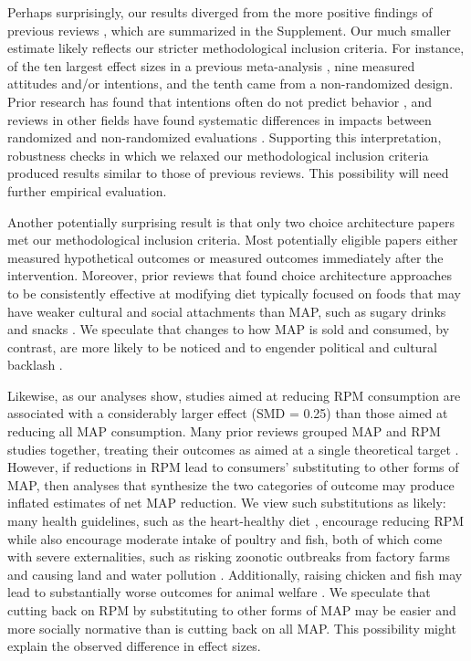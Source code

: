 \documentclass[preprint, 3p,
authoryear]{elsarticle} %
\begin{document}
Perhaps surprisingly, our results diverged from the more positive
findings of previous reviews
\citep{mathur2021meta, meier2022, mertens2022}, which are summarized in
the Supplement. Our much smaller estimate likely reflects our stricter
methodological inclusion criteria. For instance, of the ten largest
effect sizes in a previous meta-analysis
\citep{mathur2021effectiveness}, nine measured attitudes and/or
intentions, and the tenth came from a non-randomized design. Prior
research has found that intentions often do not predict behavior
\citep{mathur2021effectiveness}, and reviews in other fields have found
systematic differences in impacts between randomized and non-randomized
evaluations \citep{porat2024, stevenson2023}. Supporting this
interpretation, robustness checks in which we relaxed our methodological
inclusion criteria produced results similar to those of previous
reviews. This possibility will need further empirical evaluation.

Another potentially surprising result is that only two choice
architecture papers met our methodological inclusion criteria. Most
potentially eligible papers either measured hypothetical outcomes or
measured outcomes immediately after the intervention. Moreover, prior
reviews that found choice architecture approaches to be consistently
effective at modifying diet typically focused on foods that may have
weaker cultural and social attachments than MAP, such as sugary drinks
and snacks \citep{venema2020, adriaanse2009}. We speculate that changes
to how MAP is sold and consumed, by contrast, are more likely to be
noticed and to engender political and cultural backlash
\citep{popper2019}.

Likewise, as our analyses show, studies aimed at reducing RPM
consumption are associated with a considerably larger effect (SMD =
0.25) than those aimed at reducing all MAP consumption. Many prior
reviews grouped MAP and RPM studies together, treating their outcomes as
aimed at a single theoretical target \citep{slough2023}. However, if
reductions in RPM lead to consumers' substituting to other forms of MAP,
then analyses that synthesize the two categories of outcome may produce
inflated estimates of net MAP reduction. We view such substitutions as
likely: many health guidelines, such as the heart-healthy diet
\citep{diab2023}, encourage reducing RPM while also encourage moderate
intake of poultry and fish, both of which come with severe
externalities, such as risking zoonotic outbreaks from factory farms
\citep{hafez2020} and causing land and water pollution
\citep{grvzinic2023}. Additionally, raising chicken and fish may lead to
substantially worse outcomes for animal welfare
\citep{mathur2022ethical}. We speculate that cutting back on RPM by
substituting to other forms of MAP may be easier and more socially
normative than is cutting back on all MAP. This possibility might
explain the observed difference in effect sizes.
\end{document}

